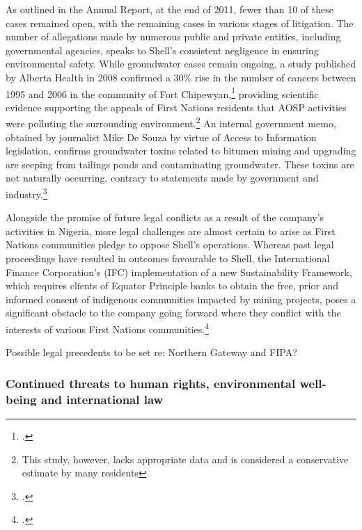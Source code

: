 \begin{enumerate}
As outlined in the Annual Report, at the end of 2011, fewer than 10 of these cases remained open, with the remaining cases in various stages of litigation. The number of allegations made by numerous public and private entities, including governmental agencies, speaks to Shell's consistent negligence in ensuring environmental safety. While groundwater cases remain ongoing, a study published by Alberta Health in 2008 confirmed a 30\% rise in the number of cancers between 1995 and 2006 in the community of Fort Chipewyan,\footcite[][]{RiskingRuin_2012} providing scientific evidence supporting the appeals of First Nations residents that AOSP activities were polluting the surrounding environment.\footnote{This study, however, lacks appropriate data and is considered a conservative estimate by many residents} An internal government memo, obtained by journalist Mike De Souza by virtue of Access to Information legislation, confirms groundwater toxins related to bitumen mining and upgrading are seeping from tailings ponds and contaminating groundwater. These toxins are not naturally occurring, contrary to statements made by government and industry.\footcite[][]{Memorandum_2012} 
\end{enumerate}


Alongside the promise of future legal conflicts as a result of the company's activities in Nigeria, more legal challenges are almost certain to arise as First Nations communities pledge to oppose Shell's operations. 
Whereas past legal proceedings have resulted in outcomes favourable to Shell, the International Finance Corporation's (IFC) implementation of a new Sustainability Framework, which requires clients of Equator Principle banks to obtain the free, prior and informed consent of indigenous communities impacted by mining projects, poses a significant obstacle to the company going forward where they conflict with the interests of various First Nations communities.\footcite[][]{Sosa_2011}



\begin{vcom}
Possible legal precedents to be set re: Northern Gateway and FIPA?
\end{vcom}


	\subsubsection{Continued threats to human rights, environmental well-being and international law}
	
	
	
